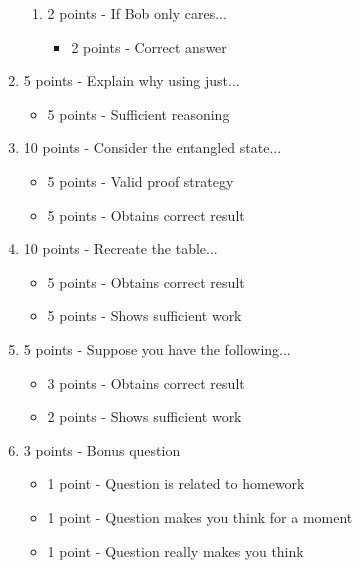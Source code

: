 \documentclass[12pt]{article}
\begin{document}
\begin{enumerate}[font=\bfseries]
\begin{enumerate}
            \item 2 points - If Bob only cares...
            \begin{itemize}
                \item 2 points - Correct answer
            \end{itemize}
        \end{enumerate}
    \item 5 points - Explain why using just...
        \begin{itemize}
            \item 5 points - Sufficient reasoning
        \end{itemize}
    \item 10 points - Consider the entangled state...
        \begin{itemize}
            \item 5 points - Valid proof strategy
            \item 5 points - Obtains correct result
        \end{itemize}
    \item 10 points - Recreate the table...
        \begin{itemize}
            \item 5 points - Obtains correct result
            \item 5 points - Shows sufficient work
        \end{itemize}
    \item 5 points - Suppose you have the following...
        \begin{itemize}
            \item 3 points - Obtains correct result
            \item 2 points - Shows sufficient work
        \end{itemize}
    \item 3 points - Bonus question
        \begin{itemize}
            \item 1 point - Question is related to homework
            \item 1 point - Question makes you think for a moment
            \item 1 point - Question really makes you think
        \end{itemize}
\end{enumerate}
\end{document}
